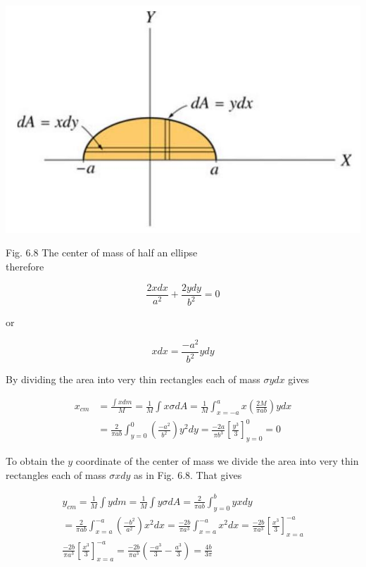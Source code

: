 \documentclass[10pt]{article}
\begin{document}
\begin{center}
\includegraphics[max width=\textwidth]{2024_09_13_db1f357d2aad0a03eb2eg-099}
\end{center}

Fig. 6.8 The center of mass of half an ellipse\\
therefore

$$
\frac{2 x d x}{a^{2}}+\frac{2 y d y}{b^{2}}=0
$$

or

$$
x d x=\frac{-a^{2}}{b^{2}} y d y
$$

By dividing the area into very thin rectangles each of mass $\sigma y d x$ gives

$$
\begin{aligned}
x_{c m} & =\frac{\int x d m}{M}=\frac{1}{M} \int x \sigma d A=\frac{1}{M} \int_{x=-a}^{a} x\left(\frac{2 M}{\pi a b}\right) y d x \\
& =\frac{2}{\pi a b} \int_{y=0}^{0}\left(\frac{-a^{2}}{b^{2}}\right) y^{2} d y=\frac{-2 a}{\pi b^{3}}\left[\frac{y^{3}}{3}\right]_{y=0}^{0}=0
\end{aligned}
$$

To obtain the $y$ coordinate of the center of mass we divide the area into very thin rectangles each of mass $\sigma x d y$ as in Fig. 6.8. That gives

$$
\begin{gathered}
y_{c m}=\frac{1}{M} \int y d m=\frac{1}{M} \int y \sigma d A=\frac{2}{\pi a b} \int_{y=0}^{b} y x d y \\
=\frac{2}{\pi a b} \int_{x=a}^{-a}\left(\frac{-b^{2}}{a^{2}}\right) x^{2} d x=\frac{-2 b}{\pi a^{3}} \int_{x=a}^{-a} x^{2} d x=\frac{-2 b}{\pi a^{3}}\left[\frac{x^{3}}{3}\right]_{x=a}^{-a} \\
\frac{-2 b}{\pi a^{3}}\left[\frac{x^{3}}{3}\right]_{x=a}^{-a}=\frac{-2 b}{\pi a^{3}}\left(\frac{-a^{3}}{3}-\frac{a^{3}}{3}\right)=\frac{4 b}{3 \pi}
\end{gathered}
$$
\end{document}
